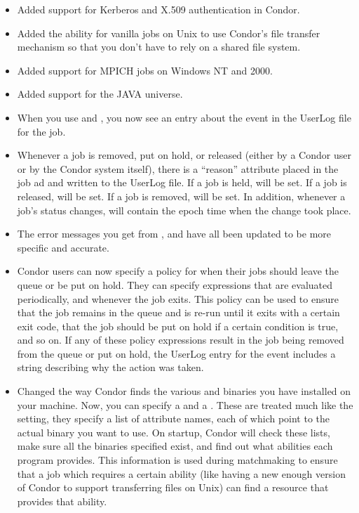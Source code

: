\begin{itemize}

\item Added support for Kerberos and X.509 authentication in Condor.  

\item Added the ability for vanilla jobs on Unix to use Condor's file
transfer mechanism so that you don't have to rely on a shared file
system.  

\item Added support for MPICH jobs on Windows NT and 2000.

\item Added support for the JAVA universe.

\item When you use  and , you now see an
entry about the event in the UserLog file for the job.

\item Whenever a job is removed, put on hold, or released (either by a
Condor user or by the Condor system itself), there is a ``reason''
attribute placed in the job ad and written to the UserLog file.  
If a job is held,  will be set.
If a job is released,  will be set.
If a job is removed,  will be set.
In addition, whenever a job's status changes,
 will contain the epoch time when the
change took place.

\item The error messages you get from ,  and
 have all been updated to be more specific and
accurate. 

\item Condor users can now specify a policy for when their jobs should
leave the queue or be put on hold.
They can specify expressions that are evaluated periodically, and
whenever the job exits.
This policy can be used to ensure that the job remains in the queue
and is re-run until it exits with a certain exit code, that the job
should be put on hold if a certain condition is true, and so on. 
If any of these policy expressions result in the job being removed
from the queue or put on hold, the UserLog entry for the event
includes a string describing why the action was taken.

\item Changed the way Condor finds the various  and
 binaries you have installed on your machine.
Now, you can specify a  and a
.
These are treated much like the  setting, they
specify a list of attribute names, each of which point to the actual
binary you want to use.
On startup, Condor will check these lists, make sure all the binaries
specified exist, and find out what abilities each program provides.
This information is used during matchmaking to ensure that a job which
requires a certain ability (like having a new enough version of Condor
to support transferring files on Unix) can find a resource that
provides that ability.


\end{itemize}
